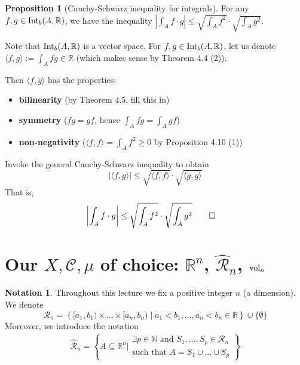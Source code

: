 \documentclass[11pt]{article}
\makeatletter
\theoremstyle{definition}
\newtheorem{prop}[thm]{Proposition}
\newtheorem{notation}[thm]{Notation}
\newcommand{\N}{\ensuremath{\mathbb{N}}}
\newcommand{\R}{\ensuremath{\mathbb{R}}}
\newenvironment{pf}[1][\proofname]{\par
  \pushQED{\qed}%
  \normalfont \topsep0\p@\relax
  \trivlist
  \item[\hskip\labelsep\itshape
  #1\@addpunct{.}]\ignorespaces
}{%
  \popQED\endtrivlist\@endpefalse
}
\makeatother
\begin{document}
\begin{prop}[Cauchy-Schwarz inequality for integrals]
For any $f, g \in {\rm Int}_b (A, \R)$, we have the inequality $\left| \int_A f \cdot g \right| \leq \sqrt{\int_A f^2} \cdot \sqrt{\int_A g^2}$.
\end{prop}
\begin{pf}
Note that ${\rm Int}_b (A, \R)$ is a vector space. For $f, g \in {\rm Int}_b (A, \R)$, let us denote $\langle f, g \rangle := \int_A fg \in \R$ (which makes sense by Theorem 4.4 (2)). 

Then $\langle f, g \rangle$ has the properties: \vspace{-1.5ex}
\begin{itemize}
    \item {\bf bilinearity} (by Theorem 4.5, fill this in)
    \item {\bf symmetry} ($fg = gf$, hence $\int_A fg = \int_A gf$) 
    \item {\bf non-negativity} ($\langle f, f \rangle = \int_A f^2 \geq 0$ by Proposition 4.10 (1))
\end{itemize}
\vspace{-1.5ex}
Invoke the general Cauchy-Schwarz inequality to obtain
$$\left| \langle f, g \rangle \right| \leq \sqrt{\langle f, f \rangle} \cdot \sqrt{\langle g, g \rangle}$$
That is,
\begin{align*} \left| \int_A f \cdot g \right| &\leq \sqrt{\int_A f^2} \cdot \sqrt{\int_A g^2} \hfill \qedhere \end{align*}
\end{pf}

\newpage
\section{Our $X, \mathcal{C}, \mu$ of choice: $\R^n$, $\widehat{\mathcal{R}}_n$, ${\rm vol}_n$}

\begin{notation}
Throughout this lecture we fix a positive integer $n$ (a dimension). We denote
$$\mathcal{R}_n = \left\{[a_1, b_1) \times \dots \times [a_n, b_n) \mid a_1 < b_1, \dots, a_n < b_n \in \R \right\} \cup \{\emptyset\}$$
Moreover, we introduce the notation
\begin{align*}
    \widehat{\mathcal{R}}_n =
    \left\{ A \subseteq \R^n \mathrel{\Big|} 
    \begin{aligned} \exists p \in \N \text{ and } S_1, \dots, S_p \in \mathcal{R}_n \\ \text{such that } A = S_1 \cup \dots \cup S_p 
    \end{aligned} 
    \right\}
\end{align*}
\end{notation}
\end{document}
